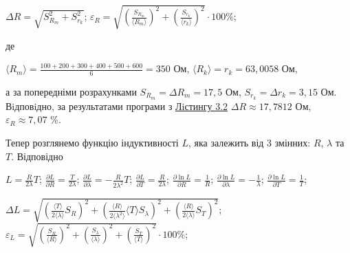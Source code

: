 \documentclass[12pt,a4paper]{article}
\begin{document}
    \begin{center}
        $\displaystyle \Delta R = \sqrt{S_{R_m}^2 + S_{r_k}^2}$;
        $\displaystyle \varepsilon_R = \sqrt{\left( \frac{S_{R_m}}{\text{⟨}R_m\text{⟩}} \right)^2 + \left( \frac{S_{r_k}}{\text{⟨}r_k\text{⟩}} \right)^2} \cdot 100 \%$;
    \end{center}

    де

    \begin{center}

        $\displaystyle \text{⟨}R_m\text{⟩} = \frac{100+200+300+400+500+600}{6} = 350$ Ом, $\text{⟨}R_k\text{⟩} = r_k = 63,0058$ Ом,

    \end{center}

    а за попередніми розрахунками $S_{R_m} = \Delta R_m = 17,5$ Ом, $S_{r_k} = \Delta r_k = 3,15$ Ом. Вiдповiдно, за результатами
    програми з \hyperlink{listing2}{Лiстингу 3.2} $\Delta R \approx 17,7812$ Ом, $\varepsilon_R \approx 7,07$ \%.

    Тепер розглянемо функцію індуктивності $L$, яка залежить від 3 змінних: $R$, $\lambda$ та $T$. Відповідно

    \begin{center}

        $\displaystyle L = \frac{R}{2\lambda}T$; $\displaystyle \frac{\partial L}{\partial R} = \frac{T}{2\lambda}$; $\displaystyle \frac{\partial L}{\partial \lambda} = -\frac{R}{2\lambda^2}T$; $\displaystyle \frac{\partial L}{\partial T} = \frac{R}{2\lambda}$;
        $\displaystyle \frac{\partial \ln L}{\partial R} = \frac{1}{R}$; $\displaystyle \frac{\partial \ln L}{\partial \lambda} = -\frac{1}{\lambda}$; $\displaystyle \frac{\partial \ln L}{\partial T} = \frac{1}{T}$;

    \end{center}

    \begin{center}

        $\displaystyle \Delta L = \sqrt{\left( \frac{\text{⟨}T\text{⟩}}{2\text{⟨}\lambda\text{⟩}} S_{R} \right)^2 + \left( \frac{\text{⟨}R\text{⟩}}{2\text{⟨}\lambda^2\text{⟩}} \text{⟨}T\text{⟩} S_{\lambda}\right)^2 + \left( \frac{\text{⟨}R\text{⟩}}{2\text{⟨}\lambda\text{⟩}} S_T \right)^2}$;
        $\displaystyle \varepsilon_L = \sqrt{\left( \frac{S_{R}}{\text{⟨}R\text{⟩}} \right)^2 + \left( \frac{S_{\lambda}}{\text{⟨}\lambda\text{⟩}} \right)^2 + \left( \frac{S_{T}}{\text{⟨}T\text{⟩}} \right)^2} \cdot 100 \%$;

    \end{center}
\end{document}
